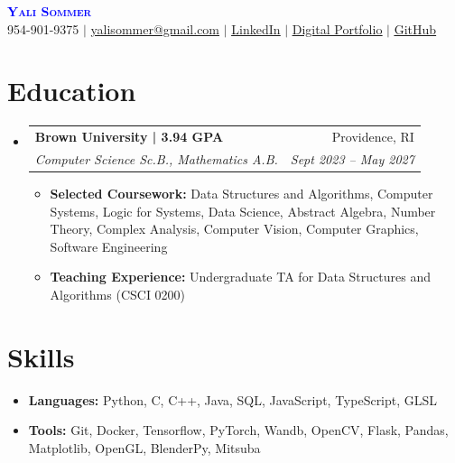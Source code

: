 \documentclass[letterpaper,11pt]{article}
\makeatletter
\newcommand{\resumeItem}[1]{
  \item\small{
    {#1 \vspace{-4pt}}
  }
}
\newcommand{\resumeSubheading}[4]{
  \vspace{-2pt}\item
    \begin{tabular*}{0.97\textwidth}[t]{l@{\extracolsep{\fill}}r}
      \textbf{#1} & #2 \\
      \textit{\small#3} & \textit{\small #4} \\
    \end{tabular*}\vspace{-7pt}
}
\newcommand{\resumeSubHeadingListStart}{\begin{itemize}[leftmargin=0.15in, label={}]}
\newcommand{\resumeSubHeadingListEnd}{\end{itemize}}
\makeatother
\begin{document}

\begin{center}
    \textbf{\Huge \scshape \textcolor{blue}{Yali Sommer}} \\ \vspace{1pt}
    \small 954-901-9375 $|$ \href{mailto:yalisommer@gmail.com}{\underline{yalisommer@gmail.com}} $|$ 
    \href{https://www.linkedin.com/in/yalisommer/}{\underline{LinkedIn}} $|$
    \href{https://yalisommer.github.io/portfolio/#/}{\underline{Digital Portfolio}} $|$
    \href{https://github.com/yalisommer}
    {\underline{GitHub}} 
\end{center}


\section{Education}
  \resumeSubHeadingListStart
    \resumeSubheading
      {Brown University | 3.94 GPA}{Providence, RI}
      {Computer Science Sc.B., Mathematics A.B.}{Sept 2023 -- May 2027}
      \resumeSubHeadingListStart
        \resumeItem{\textbf{Selected Coursework:} Data Structures and Algorithms, Computer Systems, Logic for Systems, Data Science, Abstract Algebra, Number Theory, Complex Analysis, Computer Vision, Computer Graphics, Software Engineering}
        \resumeItem{\textbf{Teaching Experience:}  Undergraduate TA for Data Structures and Algorithms (CSCI 0200)}
        
      \resumeSubHeadingListEnd
  \resumeSubHeadingListEnd

\section{Skills}
  \resumeSubHeadingListStart
    \resumeItem{\textbf{Languages:} Python, C, C++, Java, SQL, JavaScript, TypeScript, GLSL} \vspace{-1mm}
    \resumeItem{\textbf{Tools:} Git, Docker, Tensorflow, PyTorch, Wandb, OpenCV, Flask, Pandas, Matplotlib, OpenGL, BlenderPy, Mitsuba} \vspace{-1mm}
  \resumeSubHeadingListEnd
\end{document}

